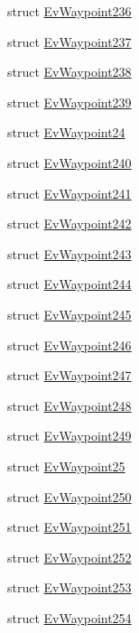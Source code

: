 \begin{DoxyCompactItemize}
\item 
struct \hyperlink{structcl__move__base__z_1_1EvWaypoint236}{Ev\+Waypoint236}
\item 
struct \hyperlink{structcl__move__base__z_1_1EvWaypoint237}{Ev\+Waypoint237}
\item 
struct \hyperlink{structcl__move__base__z_1_1EvWaypoint238}{Ev\+Waypoint238}
\item 
struct \hyperlink{structcl__move__base__z_1_1EvWaypoint239}{Ev\+Waypoint239}
\item 
struct \hyperlink{structcl__move__base__z_1_1EvWaypoint24}{Ev\+Waypoint24}
\item 
struct \hyperlink{structcl__move__base__z_1_1EvWaypoint240}{Ev\+Waypoint240}
\item 
struct \hyperlink{structcl__move__base__z_1_1EvWaypoint241}{Ev\+Waypoint241}
\item 
struct \hyperlink{structcl__move__base__z_1_1EvWaypoint242}{Ev\+Waypoint242}
\item 
struct \hyperlink{structcl__move__base__z_1_1EvWaypoint243}{Ev\+Waypoint243}
\item 
struct \hyperlink{structcl__move__base__z_1_1EvWaypoint244}{Ev\+Waypoint244}
\item 
struct \hyperlink{structcl__move__base__z_1_1EvWaypoint245}{Ev\+Waypoint245}
\item 
struct \hyperlink{structcl__move__base__z_1_1EvWaypoint246}{Ev\+Waypoint246}
\item 
struct \hyperlink{structcl__move__base__z_1_1EvWaypoint247}{Ev\+Waypoint247}
\item 
struct \hyperlink{structcl__move__base__z_1_1EvWaypoint248}{Ev\+Waypoint248}
\item 
struct \hyperlink{structcl__move__base__z_1_1EvWaypoint249}{Ev\+Waypoint249}
\item 
struct \hyperlink{structcl__move__base__z_1_1EvWaypoint25}{Ev\+Waypoint25}
\item 
struct \hyperlink{structcl__move__base__z_1_1EvWaypoint250}{Ev\+Waypoint250}
\item 
struct \hyperlink{structcl__move__base__z_1_1EvWaypoint251}{Ev\+Waypoint251}
\item 
struct \hyperlink{structcl__move__base__z_1_1EvWaypoint252}{Ev\+Waypoint252}
\item 
struct \hyperlink{structcl__move__base__z_1_1EvWaypoint253}{Ev\+Waypoint253}
\item 
struct \hyperlink{structcl__move__base__z_1_1EvWaypoint254}{Ev\+Waypoint254}

\end{DoxyCompactItemize}
